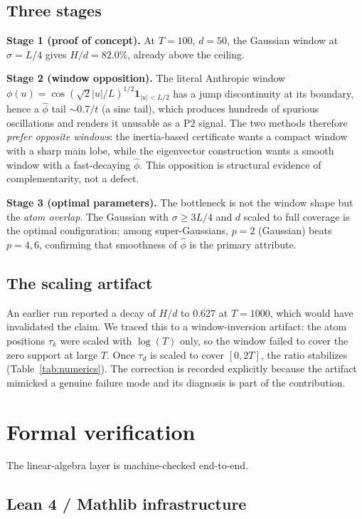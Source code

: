 \documentclass[11pt]{article}
\begin{document}
\subsection{Three stages}

\textbf{Stage 1 (proof of concept).} At $T=100$, $d=50$, the Gaussian window at $\sigma=L/4$ gives $H/d=82.0\%$, already above the ceiling.

\textbf{Stage 2 (window opposition).} The literal Anthropic window $\phi(u)=\cos(\sqrt2|u|/L)^{1/2}\mathbf 1_{|u|<L/2}$ has a jump discontinuity at its boundary, hence a $\hat\phi$ tail $\sim0.7/t$ (a sinc tail), which produces hundreds of spurious oscillations and renders it unusable as a P2 signal. The two methods therefore \emph{prefer opposite windows}: the inertia-based certificate wants a compact window with a sharp main lobe, while the eigenvector construction wants a smooth window with a fast-decaying $\hat\phi$. This opposition is structural evidence of complementarity, not a defect.

\textbf{Stage 3 (optimal parameters).} The bottleneck is not the window shape but the \emph{atom overlap}. The Gaussian with $\sigma\ge 3L/4$ and $d$ scaled to full coverage is the optimal configuration; among super-Gaussians, $p=2$ (Gaussian) beats $p=4,6$, confirming that smoothness of $\hat\phi$ is the primary attribute.

\subsection{The scaling artifact}\label{sec:artifact}

An earlier run reported a decay of $H/d$ to $0.627$ at $T=1000$, which would have invalidated the claim. We traced this to a window-inversion artifact: the atom positions $\tau_k$ were scaled with $\log(T)$ only, so the window failed to cover the zero support at large $T$. Once $\tau_d$ is scaled to cover $[0,2T]$, the ratio stabilizes (Table~\ref{tab:numerics}). The correction is recorded explicitly because the artifact mimicked a genuine failure mode and its diagnosis is part of the contribution.

\section{Formal verification}

The linear-algebra layer is machine-checked end-to-end.

\subsection{Lean 4 / Mathlib infrastructure}
\end{document}
